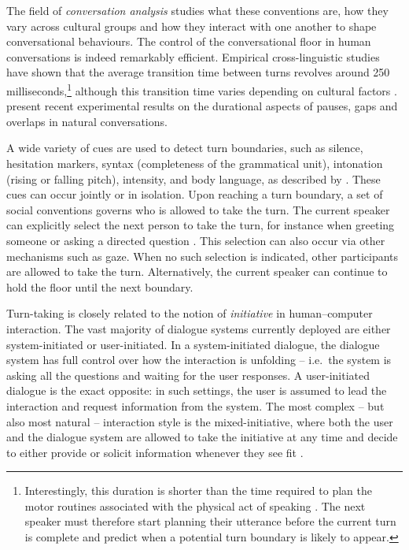 The field of  \textit{conversation analysis} studies what these conventions are, how they vary across cultural groups and how they interact with one another to shape conversational behaviours. The control of the conversational floor in human conversations is indeed remarkably efficient.  Empirical cross-linguistic studies have shown that the average transition time between turns revolves around 250 milliseconds,\footnote{Interestingly, this duration is shorter than the time required to plan the motor routines associated with the physical act of speaking \cite[][p. 8]{habets2007}.  The next speaker must therefore start planning their utterance before the current turn is complete and predict when a potential turn boundary is likely to appear.} although this transition time varies depending on cultural factors \citep{Stivers30062009}. \cite{Heldner2010555} present recent experimental results on the durational aspects of pauses, gaps and overlaps in natural conversations.

A wide variety of cues are used to detect turn boundaries, such as silence, hesitation markers, syntax (completeness of the grammatical unit), intonation (rising or falling pitch), intensity, and body language, as described by \cite{Duncan1972}.   These cues can occur jointly or in isolation. Upon reaching a turn boundary, a set of social conventions governs who is allowed to take the turn.  The current speaker can explicitly select the next person to take the turn, for instance when greeting someone or asking a directed question \citep{sacks1974}.   This selection can also occur via other mechanisms such as gaze.  When no such selection is indicated, other participants are allowed to take the turn.  Alternatively, the current speaker can continue to hold the floor until the next boundary. 

Turn-taking is closely related to the notion of \textit{initiative} in human--computer interaction. The vast majority of dialogue systems currently deployed are either system-initiated or user-initiated.  In a system-initiated dialogue, the dialogue system has full control over how the interaction is unfolding -- i.e.\ the system is asking all the questions and waiting for the user responses.  A user-initiated dialogue is the exact opposite: in such settings, the user is assumed to lead the interaction and request information from the system.  The most complex -- but also most natural -- interaction style is the mixed-initiative, where both the user and the dialogue system are allowed to take the initiative at any time and decide to either provide or solicit information whenever they see fit \citep{Horvitz:1999}. 

